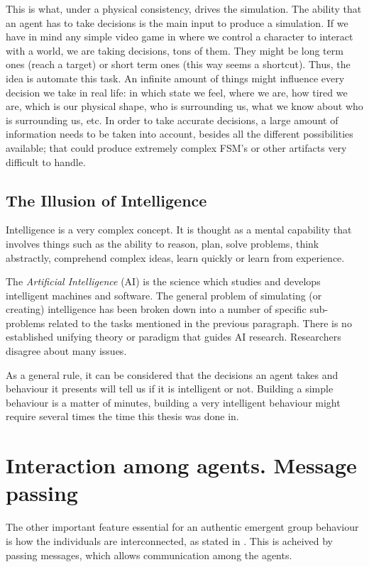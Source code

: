 This is what, under a physical consistency, drives the simulation. The ability that an agent has to take decisions is the main input to produce a simulation. If we have in mind any simple video game in where we control a character to interact with a world, we are taking decisions, tons of them. They might be long term ones (reach a target) or short term ones (this way seems a shortcut). Thus, the idea is automate this task. An infinite amount of things might influence every decision we take in real life: in which state we feel, where we are, how tired we are, which is our physical shape, who is surrounding us, what we know about who is surrounding us, etc. In order to take accurate decisions, a large amount of information needs to be taken into account, besides all the different possibilities available; that could produce extremely complex FSM's or other artifacts very difficult to handle.

\subsection{The Illusion of Intelligence}

Intelligence is a very complex concept. It is thought as a mental capability that involves things such as the ability to reason, plan, solve problems, think abstractly, comprehend complex ideas, learn quickly or learn from experience.

The \emph{Artificial Intelligence} (AI) is the science which studies and develops intelligent machines and software. The general problem of simulating (or creating) intelligence has been broken down into a number of specific sub-problems related to the tasks mentioned in the previous paragraph. There is no established unifying theory or paradigm that guides AI research. Researchers disagree about many issues.

As a general rule, it can be considered that the decisions an agent takes and behaviour it presents will tell us if it is intelligent or not. Building a simple behaviour is a matter of minutes, building a very intelligent behaviour might require several times the time this thesis was done in.


\section{Interaction among agents. Message passing}

The other important feature essential for an authentic emergent group behaviour is how the individuals are interconnected, as stated in \citep{kleinrock}. This is acheived by passing messages, which allows communication among the agents.

